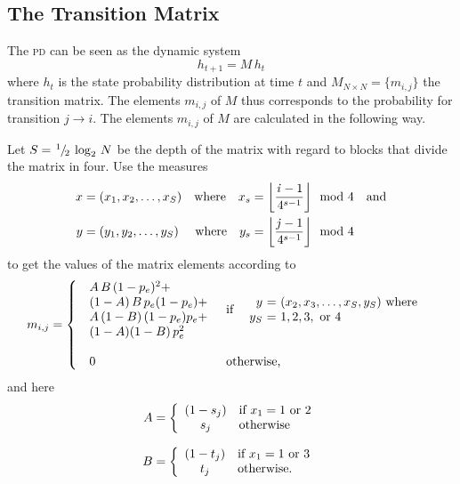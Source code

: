 \subsection{The Transition Matrix}
The \textsc{pd} can be seen as the dynamic system
\begin{equation*}
h_{t+1} = M\, h_t
\end{equation*}
where $h_t$ is the state probability distribution at time $t$ and $M_{N\times N}= \{ m_{i,j}\}$ the transition matrix. The elements $m_{i, j}$ of $M$ thus corresponds to the probability for transition $j\rightarrow i$. The elements $m_{i, j}$ of $M$ are calculated in the following way.\mypar

Let $S = \hspace{1pt} ^{1} \hspace{-0.8pt} / \hspace{-1.5pt} _{2} \hspace{2pt}\log_2\, N$ be the depth of the matrix with regard to blocks that divide the matrix in four. Use the measures
\begin{align*}
x &= (x_1, x_2, \dots, x_S) &\textrm{where} \quad x_s &= \floor{\frac{\makebox[1ex]{\textit{i}}-1}{4^{s-1}}} \mod 4 \quad \textrm{and}\\
y &= (y_1, y_2, \dots, y_S) &\textrm{where} \quad y_s &= \floor{\frac{\makebox[1ex]{\textit{j}}-1}{4^{s-1}}} \mod 4
\end{align*}
to get the values of the matrix elements according to
\begin{equation*}
m_{i, j} = \left\{
\begin{array}{ll}
\begin{array}{l}
A\,B\,(1-p_e)^2 + \\
(1 - A)\,B\, p_e(1-p_e) + \\
A\,(1-B)\,(1 - p_e)p_e + \\
(1-A)(1-B)\,p_e^2 \\[\baselineskip]
\end{array}
 & \textrm{if~}
\begin{array}{r@{~=~}l}
\quad y & (x_2, x_3, \dots, x_S, y_S) \textrm{~where~} \\
    y_S & 1, 2, 3, \textrm{~or~} 4
\end{array}
\\~\vspace{-0.5\baselineskip}~\\
\begin{array}{l}
0
\end{array}
 & \textrm{otherwise,}
\end{array}
\right.
\end{equation*}
and here
\begin{align*}
A &= \left\{%
\begin{array}{cl}%
(1-s_j) & \textrm{if~} x_1 = 1 \textrm{~or~} 2 \\
s_j & \textrm{otherwise}
\end{array}%
\right. \\[0.5\baselineskip]
B &= \left\{%
\begin{array}{cl}%
(1-t_j) & \textrm{if~} x_1 = 1 \textrm{~or~} 3 \\
t_j & \textrm{otherwise.}%
\end{array}%
\right.%
\end{align*}

